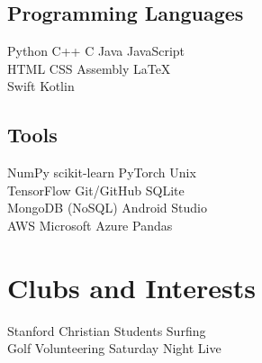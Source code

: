 \documentclass[]{deedy-resume-openfont}
\begin{document}
\begin{minipage}[t]{0.33\textwidth}
\subsection{Programming Languages}
\hspace{\parindent} \hspace{\parindent} \hspace{\parindent} Python \textbullet{} C++ \textbullet{} C \textbullet{} Java \textbullet{} JavaScript \\
\hspace{\parindent} \hspace{\parindent} \hspace{\parindent} HTML \textbullet{} CSS \textbullet{} Assembly \textbullet{} \LaTeX \\
\hspace{\parindent} \hspace{\parindent} \hspace{\parindent} Swift \textbullet{} Kotlin
\sectionsep

\subsection{Tools}
\hspace{\parindent} \hspace{\parindent} \hspace{\parindent} NumPy \textbullet{} scikit-learn \textbullet{} PyTorch \textbullet{} Unix \\
\hspace{\parindent} \hspace{\parindent} \hspace{\parindent} TensorFlow \textbullet{} Git/GitHub \textbullet{} SQLite \\
\hspace{\parindent} \hspace{\parindent} \hspace{\parindent} MongoDB (NoSQL) \textbullet{} Android Studio \\
\hspace{\parindent} \hspace{\parindent} \hspace{\parindent} AWS \textbullet{} Microsoft Azure \textbullet{} Pandas
\sectionsep


\section{Clubs and Interests}
Stanford Christian Students \textbullet{} Surfing \\
Golf \textbullet{} Volunteering \textbullet{} Saturday Night Live


\end{minipage}
\end{document}
